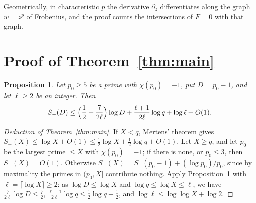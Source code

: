 \documentclass[11pt]{amsart}
\newtheorem{proposition}[theorem]{Proposition}
\begin{document}
Geometrically, in characteristic $p$ the derivative $\partial_z$ differentiates along the graph
$w=z^p$ of Frobenius, and the proof counts the intersections of $F=0$ with that graph.

\section{Proof of Theorem~\ref{thm:main}}

\begin{proposition}\label{prop:ell}
Let $p_0\ge5$ be a prime with $\chi(p_0)=-1$, put $D=p_0-1$, and let $\ell\ge2$ be an integer. Then
\[
S_-(D)\le\Bigl(\frac12+\frac{7}{2\ell}\Bigr)\log D+\frac{\ell+1}{2\ell}\log q+\log\ell+O(1).
\]
\end{proposition}

\begin{proof}[Deduction of Theorem~\ref{thm:main}]
If $X<q$, Mertens' theorem gives $S_-(X)\le\log X+O(1)\le\frac12\log X+\frac12\log q+O(1)$. Let
$X\ge q$, and let $p_0$ be the largest prime $\le X$ with $\chi(p_0)=-1$; if there is none, or
$p_0\le3$, then $S_-(X)=O(1)$. Otherwise $S_-(X)=S_-(p_0-1)+(\log p_0)/p_0$, since by
maximality the primes in $(p_0,X]$ contribute nothing. Apply
Proposition~\ref{prop:ell} with $\ell=\lceil\log X\rceil\ge2$: as $\log D\le\log X$ and
$\log q\le\log X\le\ell$, we have $\frac7{2\ell}\log D\le\frac72$,
$\frac{\ell+1}{2\ell}\log q\le\frac12\log q+\frac12$, and $\log\ell\le\log\log X+\log2$.
\end{proof}
\end{document}
